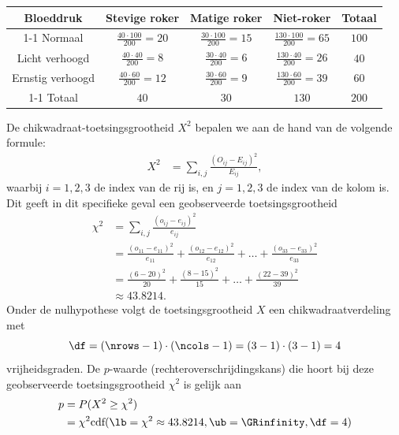 {\begin{center}
\begin{tabular}{ccccc}
                {\bfseries Bloeddruk} & {\bfseries Stevige roker} & {\bfseries Matige roker} & {\bfseries Niet-roker} & {\bfseries Totaal} \\
            \cmidrule{1-1} \cmidrule{2-2} \cmidrule{3-3} \cmidrule{4-4} \cmidrule{5-5}
                Normaal & $\frac{40\cdot 100}{200} = 20$ & $\frac{30\cdot 100}{200} = 15$ & $\frac{130\cdot 100}{200} = 65$ & $100$ \\
                Licht verhoogd & $\frac{40\cdot 40}{200} = 8$ & $\frac{30\cdot 40}{200} = 6$ & $\frac{130\cdot 40}{200} = 26$ & $40$ \\
                Ernstig verhoogd & $\frac{40\cdot 60}{200} = 12$ & $\frac{30\cdot 60}{200} = 9$ & $\frac{130\cdot 60}{200} = 39$ & $60$ \\
            \cmidrule{1-1} \cmidrule{2-2} \cmidrule{3-3} \cmidrule{4-4} \cmidrule{5-5}
                Totaal & $40$ & $30$ & $130$ & $200$ \\
            \bottomrule
        \end{tabular}
    \end{center}
    De chikwadraat-toetsingsgrootheid $X^2$ bepalen we aan de hand van de volgende formule:
    \begin{align*}
        X^2  &= \sum_{i,j} \frac{(O_{ij} - E_{ij})^2}{E_{ij}},
    \end{align*}
    waarbij $i = 1,2,3$ de index van de rij is, en $j = 1,2,3$ de index van de kolom is.
    Dit geeft in dit specifieke geval een geobserveerde toetsingsgrootheid   
    \begin{align*}
        \chi^2  &= \sum_{i,j} \frac{(o_{ij} - e_{ij})^2}{e_{ij}} \\
                &=\frac{(o_{11} - e_{11})^2}{e_{11}} + \frac{(o_{12} - e_{12})^2}{e_{12}} + \ldots + \frac{(o_{33} - e_{33})^2}{e_{33}} \\
                &= \frac{(6 - 20)^2}{20} + \frac{(8 - 15)^2}{15} + \ldots + \frac{(22-39)^2}{39}\\
                &\approx 43.8214.
    \end{align*}
    Onder de nulhypothese volgt de toetsingsgrootheid $X$ een chikwadraatverdeling met
    \[
        \df = (\nrows-1) \cdot (\ncols-1) = (3-1) \cdot (3-1) = 4
    \]
    vrijheidsgraden.
    De $p$-waarde (rechteroverschrijdingskans) die hoort bij deze geobserveerde toetsingsgrootheid $\chi^2$ is gelijk aan
    \begin{align*}
        p   &= P(X^2 \ge \chi^2) \\
            &= \chi^2\text{cdf}(\lb=\chi^2 \approx 43.8214, \ub=\GRinfinity, \df=4) \\

\end{align*}}
